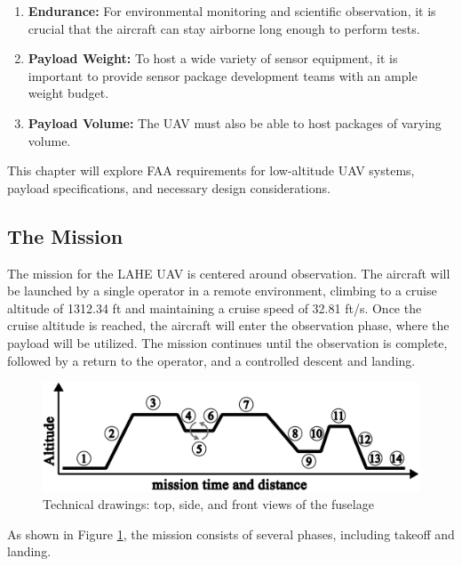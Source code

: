 \documentclass[12pt]{article}
\begin{document}
	\begin{enumerate}
		\item \textbf{Endurance:} For environmental monitoring and scientific observation, it is crucial that the aircraft can stay airborne long enough to perform tests. 
		\item \textbf{Payload Weight:} To host a wide variety of sensor equipment, it is important to provide sensor package development teams with an ample weight budget.
		\item \textbf{Payload Volume:} The UAV must also be able to host packages of varying volume.
	\end{enumerate}
	
	This chapter will explore FAA requirements for low-altitude UAV systems, payload specifications, and necessary design considerations.
	
	\subsection{The Mission}
	The mission for the LAHE UAV is centered around observation. The aircraft will be launched by a single operator in a remote environment, climbing to a cruise altitude of 1312.34 ft and maintaining a cruise speed of 32.81 ft/s. Once the cruise altitude is reached, the aircraft will enter the observation phase, where the payload will be utilized. The mission continues until the observation is complete, followed by a return to the operator, and a controlled descent and landing.
	
	\begin{figure}[h!]
		\centering
		\includegraphics[width=4.5 in]{Media/MissionPlan.png} %
		\caption{Technical drawings: top, side, and front views of the fuselage}
		\label{fig:mission_plan}
	\end{figure}
	
	As shown in Figure \ref{fig:mission_plan}, the mission consists of several phases, including takeoff and landing.
	
\end{document}
